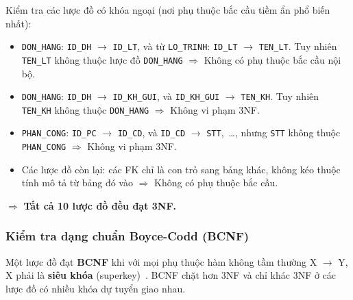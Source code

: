 \documentclass[11pt]{report}
\begin{document}
Kiểm tra các lược đồ có khóa ngoại (nơi phụ thuộc bắc cầu tiềm ẩn phổ biến nhất):
\begin{itemize}
    \item \texttt{DON\_HANG}: \texttt{ID\_DH} $\to$ \texttt{ID\_LT}, và từ \texttt{LO\_TRINH}: \texttt{ID\_LT} $\to$ \texttt{TEN\_LT}. Tuy nhiên \texttt{TEN\_LT} không thuộc lược đồ \texttt{DON\_HANG} $\Rightarrow$ Không có phụ thuộc bắc cầu nội bộ.
    
    \item \texttt{DON\_HANG}: \texttt{ID\_DH} $\to$ \texttt{ID\_KH\_GUI}, và \texttt{ID\_KH\_GUI} $\to$ \texttt{TEN\_KH}. Tuy nhiên \texttt{TEN\_KH} không thuộc \texttt{DON\_HANG} $\Rightarrow$ Không vi phạm 3NF.
    
    \item \texttt{PHAN\_CONG}: \texttt{ID\_PC} $\to$ \texttt{ID\_CD}, và \texttt{ID\_CD} $\to$ \texttt{STT},~\ldots, nhưng \texttt{STT} không thuộc \texttt{PHAN\_CONG} $\Rightarrow$ Không vi phạm 3NF.
    
    \item Các lược đồ còn lại: các FK chỉ là con trỏ sang bảng khác, không kéo thuộc tính mô tả từ bảng đó vào $\Rightarrow$ Không có phụ thuộc bắc cầu.
\end{itemize}
$\Rightarrow$ \textbf{Tất cả 10 lược đồ đều đạt 3NF.}

\subsubsection{Kiểm tra dạng chuẩn Boyce-Codd (BCNF)}

Một lược đồ đạt \textbf{BCNF} khi với mọi phụ thuộc hàm không tầm thường X $\to$ Y, X phải là \textbf{siêu khóa} (superkey)~\cite{ieee1989er}. BCNF chặt hơn 3NF và chỉ khác 3NF ở các lược đồ có nhiều khóa dự tuyển giao nhau.
\end{document}
